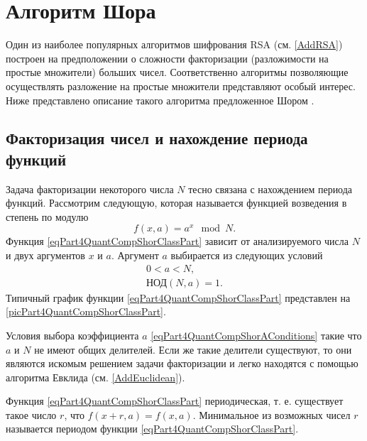 \section{Алгоритм Шора}
\label{Part4QuantCompShor}
Один из наиболее популярных алгоритмов шифрования RSA (см. 
\autoref{AddRSA}) 
построен на предположении о сложности факторизации
(разложимости на простые множители) больших чисел. Соответственно
алгоритмы позволяющие осуществлять разложение на простые множители
представляют особый интерес. Ниже представлено описание такого
алгоритма предложенное Шором \cite{bShor94}.

\subsection{Факторизация чисел и нахождение периода функций}
\label{sec:part4:algoshor:periodfind}
Задача факторизации некоторого числа $N$ тесно связана с нахождением периода
функций. Рассмотрим следующую, которая называется функцией возведения
в степень по модулю
\begin{equation}
f\left(x, a\right) = a^x \mod N.
\label{eqPart4QuantCompShorClassPart}
\end{equation}
Функция \eqref{eqPart4QuantCompShorClassPart} зависит от
анализируемого числа $N$ и двух аргументов $x$ и $a$. Аргумент $a$
выбирается из следующих условий
\begin{eqnarray}
0 < a < N,
\nonumber \\
\mbox{НОД}\left(N, a\right) = 1.
\label{eqPart4QuantCompShorAConditions}
\end{eqnarray}
Типичный график функции \eqref{eqPart4QuantCompShorClassPart} представлен на
\autoref{picPart4QuantCompShorClassPart}.




Условия выбора коэффициента $a$
\eqref{eqPart4QuantCompShorAConditions} такие что $a$ и $N$ не имеют
общих делителей. Если же такие делители существуют, то они являются
искомым решением задачи факторизации и легко находятся с помощью
алгоритма Евклида (см. \autoref{AddEuclidean}).

Функция \eqref{eqPart4QuantCompShorClassPart} периодическая,
т. е. существует такое число $r$, что $f\left(x + r, a\right) = 
f\left(x, a\right)$. Минимальное из возможных чисел $r$ называется
периодом функции \eqref{eqPart4QuantCompShorClassPart}. 


